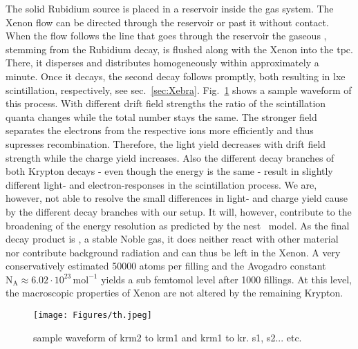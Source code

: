 The solid Rubidium source is placed in a reservoir inside the gas system.
The Xenon flow can be directed through the reservoir or past it without contact.
When the flow follows the line that goes through the reservoir the gaseous , stemming from the Rubidium decay, is flushed along with the Xenon into the \gls{tpc}.
There, it disperses and distributes homogeneously within approximately a minute.
Once it decays, the second decay follows promptly, both resulting in \gls{lxe} scintillation, respectively, see sec.~\ref{sec:Xebra}.
Fig.~\ref{fig:waveform_kr} shows a sample waveform of this process.
With different drift field strengths the ratio of the scintillation quanta changes while the total number stays the same.
The stronger field separates the electrons from the respective ions more efficiently and thus supresses recombination.
Therefore, the light yield decreases with drift field strength while the charge yield increases.
Also the different decay branches of both Krypton decays - even though the energy is the same - result in slightly different light- and electron-responses in the scintillation process.
We are, however, not able to resolve the small differences in light- and charge yield cause by the different decay branches with our setup.
It will, however, contribute to the broadening of the energy resolution as predicted by the \gls{nest}~\cite{Szydagis13} model.
As the final decay product is , a stable Noble gas, it does neither react with other material nor contribute background radiation and can thus be left in the Xenon.
A very conservatively estimated \SI{50000}{} atoms per filling and the Avogadro constant $ \mathrm{N}_\mathrm{A} \approx 6.02\cdot10^{23}\,\mathrm{mol}^{-1} $ yields a sub femtomol level after 1000 fillings.
At this level, the macroscopic properties of Xenon are not altered by the remaining Krypton.


\begin{figure}
    \centering
    \texttt{[image: Figures/th.jpeg]}  %
    \caption[Waveform Krypton]{
        sample waveform of krm2 to krm1 and krm1 to kr. s1, s2... etc.
    }
    \label{fig:waveform_kr}
\end{figure}




